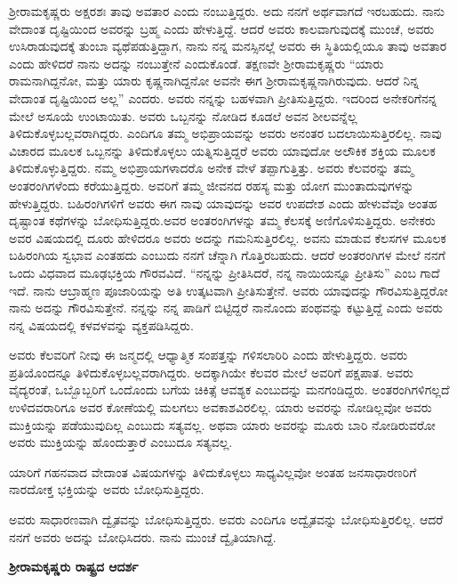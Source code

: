 ಶ‍್ರೀರಾಮಕೃಷ್ಣರು ಅಕ್ಷರಶಃ ತಾವು ಅವತಾರ ಎಂದು ನಂಬುತ್ತಿದ್ದರು. ಅದು ನನಗೆ ಅರ್ಥವಾಗದೆ ಇರಬಹುದು. ನಾನು ವೇದಾಂತ ದೃಷ್ಟಿಯಿಂದ ಅವರನ್ನು ಬ್ರಹ್ಮ ಎಂದು ಹೇಳುತ್ತಿದ್ದೆ. ಆದರೆ ಅವರು ಕಾಲವಾಗುವುದಕ್ಕೆ ಮುಂಚೆ, ಅವರು ಉಸಿರಾಡುವುದಕ್ಕೆ ತುಂಬಾ ವ್ಯಥೆಪಡುತ್ತಿದ್ದಾಗ, ನಾನು ನನ್ನ ಮನಸ್ಸಿನಲ್ಲೆ ಅವರು ಈ ಸ್ಥಿತಿಯಲ್ಲಿಯೂ ತಾವು ಅವತಾರ ಎಂದು ಹೇಳಿದರೆ ನಾನು ಅದನ್ನು ನಂಬುತ್ತೇನೆ ಎಂದುಕೊಂಡೆ. ತಕ್ಷಣವೇ ಶ‍್ರೀರಾಮಕೃಷ್ಣರು “ಯಾರು ರಾಮನಾಗಿದ್ದನೋ, ಮತ್ತು ಯಾರು ಕೃಷ್ಣನಾಗಿದ್ದನೋ ಅವನೇ ಈಗ ಶ‍್ರೀರಾಮಕೃಷ್ಣನಾಗಿರುವುದು. ಆದರೆ ನಿನ್ನ ವೇದಾಂತ ದೃಷ್ಟಿಯಿಂದ ಅಲ್ಲ” ಎಂದರು. ಅವರು ನನ್ನನ್ನು ಬಹಳವಾಗಿ ಪ್ರೀತಿಸುತ್ತಿದ್ದರು. ಇದರಿಂದ ಅನೇಕರಿಗೆ\break ನನ್ನ ಮೇಲೆ ಅಸೂಯೆ ಉಂಟಾಯಿತು. ಅವರು ಒಬ್ಬನನ್ನು ನೋಡಿದ ಕೂಡಲೆ ಅವನ ಶೀಲವನ್ನೆಲ್ಲ ತಿಳಿದುಕೊಳ್ಳಬಲ್ಲವರಾಗಿದ್ದರು. ಎಂದಿಗೂ ತಮ್ಮ ಅಭಿಪ್ರಾಯವನ್ನು ಅವರು ಅನಂತರ ಬದಲಾಯಿಸುತ್ತಿರಲಿಲ್ಲ. ನಾವು ವಿಚಾರದ ಮೂಲಕ ಒಬ್ಬನನ್ನು ತಿಳಿದುಕೊಳ್ಳಲು ಯತ್ನಿಸುತ್ತಿದ್ದರೆ ಅವರು ಯಾವುದೋ ಅಲೌಕಿಕ ಶಕ್ತಿಯ ಮೂಲಕ ತಿಳಿದುಕೊಳ್ಳುತ್ತಿದ್ದರು. ನಮ್ಮ ಅಭಿಪ್ರಾಯಗಳಾದರೊ ಅನೇಕ ವೇಳೆ ತಪ್ಪಾಗುತ್ತಿತ್ತು. ಅವರು ಕೆಲವರನ್ನು ತಮ್ಮ ಅಂತರಂಗಿಗಳೆಂದು ಕರೆಯುತ್ತಿದ್ದರು. ಅವರಿಗೆ ತಮ್ಮ ಜೀವನದ ರಹಸ್ಯ ಮತ್ತು ಯೋಗ ಮುಂತಾದುವುಗಳನ್ನು ಹೇಳುತ್ತಿದ್ದರು. ಬಹಿರಂಗಿಗಳಿಗೆ ಅವರು ಈಗ ನಾವು ಯಾವುದನ್ನು ಅವರ ಉಪದೇಶ ಎಂದು ಹೇಳುವೆವೊ ಅಂತಹ ದೃಷ್ಟಾಂತ ಕಥೆಗಳನ್ನು ಬೋಧಿಸುತ್ತಿದ್ದರು.\break ಅವರ ಅಂತರಂಗಿಗಳನ್ನು ತಮ್ಮ ಕೆಲಸಕ್ಕೆ ಅಣಿಗೊಳಿಸುತ್ತಿದ್ದರು. ಅನೇಕರು ಅವರ ವಿಷಯದಲ್ಲಿ ದೂರು ಹೇಳಿದರೂ ಅವರು ಅದನ್ನು ಗಮನಿಸುತ್ತಿರಲಿಲ್ಲ. ಅವನು ಮಾಡುವ ಕೆಲಸಗಳ ಮೂಲಕ ಬಹಿರಂಗಿಯ ಸ್ವಭಾವ ಎಂತಹದು ಎಂಬುದು ನನಗೆ ಚೆನ್ನಾಗಿ ಗೊತ್ತಿರಬಹುದು. ಆದರೆ ಅಂತರಂಗಿಗಳ ಮೇಲೆ ನನಗೆ ಒಂದು ವಿಧವಾದ ಮೂಢಭಕ್ತಿಯ ಗೌರವವಿದೆ. “ನನ್ನನ್ನು ಪ್ರೀತಿಸಿದರೆ, ನನ್ನ ನಾಯಿಯನ್ನೂ ಪ್ರೀತಿಸು” ಎಂಬ ಗಾದೆ ಇದೆ. ನಾನು ಆ\break ಬ್ರಾಹ್ಮಣ ಪೂಜಾರಿಯನ್ನು ಅತಿ ಉತ್ಕಟವಾಗಿ ಪ್ರೀತಿಸುತ್ತೇನೆ. ಅವರು ಯಾವುದನ್ನು ಗೌರವಿಸುತ್ತಿದ್ದರೋ ನಾನು ಅದನ್ನು ಗೌರವಿಸುತ್ತೇನೆ. ನನ್ನನ್ನು ನನ್ನ ಪಾಡಿಗೆ ಬಿಟ್ಟಿದ್ದರೆ ನಾನೊಂದು ಪಂಥವನ್ನು ಕಟ್ಟುತ್ತಿದ್ದೆ ಎಂದು ಅವರು ನನ್ನ ವಿಷಯದಲ್ಲಿ ಕಳವಳವನ್ನು ವ್ಯಕ್ತಪಡಿಸಿದ್ದರು.

ಅವರು ಕೆಲವರಿಗೆ ನೀವು ಈ ಜನ್ಮದಲ್ಲಿ ಆಧ್ಯಾತ್ಮಿಕ ಸಂಪತ್ತನ್ನು ಗಳಿಸಲಾರಿರಿ ಎಂದು ಹೇಳುತ್ತಿದ್ದರು. ಅವರು ಪ್ರತಿಯೊಂದನ್ನೂ ತಿಳಿದುಕೊಳ್ಳಬಲ್ಲವರಾಗಿದ್ದರು. ಅದಕ್ಕಾಗಿಯೇ ಕೆಲವರ ಮೇಲೆ ಅವರಿಗೆ ಪಕ್ಷಪಾತ. ಅವರು ವೈದ್ಯರಂತೆ, ಒಬ್ಬೊಬ್ಬರಿಗೆ ಒಂದೊಂದು ಬಗೆಯ ಚಿಕಿತ್ಸೆ ಆವಶ್ಯಕ ಎಂಬುದನ್ನು ಮನಗಂಡಿದ್ದರು. ಅಂತರಂಗಿಗಳಿಗಲ್ಲದೆ ಉಳಿದವರಾರಿಗೂ ಅವರ ಕೋಣೆಯಲ್ಲಿ ಮಲಗಲು ಅವಕಾಶವಿರಲಿಲ್ಲ. ಯಾರು ಅವರನ್ನು ನೋಡಿಲ್ಲವೋ ಅವರು ಮುಕ್ತಿಯನ್ನು ಪಡೆಯುವುದಿಲ್ಲ ಎಂಬುದು ಸತ್ಯವಲ್ಲ. ಅಥವಾ ಯಾರು ಅವರನ್ನು ಮೂರು ಬಾರಿ ನೋಡಿರುವರೋ ಅವರು ಮುಕ್ತಿಯನ್ನು ಹೊಂದುತ್ತಾರೆ ಎಂಬುದೂ ಸತ್ಯವಲ್ಲ.

ಯಾರಿಗೆ ಗಹನವಾದ ವೇದಾಂತ ವಿಷಯಗಳನ್ನು ತಿಳಿದುಕೊಳ್ಳಲು ಸಾಧ್ಯವಿಲ್ಲವೋ ಅಂತಹ ಜನಸಾಧಾರಣರಿಗೆ ನಾರದೋಕ್ತ ಭಕ್ತಿಯನ್ನು ಅವರು ಬೋಧಿಸುತ್ತಿದ್ದರು.

ಅವರು ಸಾಧಾರಣವಾಗಿ ದ್ವೈತವನ್ನು ಬೋಧಿಸುತ್ತಿದ್ದರು. ಅವರು ಎಂದಿಗೂ ಅದ್ವೈತವನ್ನು ಬೋಧಿಸುತ್ತಿರಲಿಲ್ಲ. ಆದರೆ ನನಗೆ ಅವರು ಅದನ್ನು ಬೋಧಿಸಿದರು. ನಾನು ಮುಂಚೆ ದ್ವೈತಿಯಾಗಿದ್ದೆ.

\centerline{\textbf{ಶ‍್ರೀರಾಮಕೃಷ್ಣರು ರಾಷ್ಟ್ರದ ಆದರ್ಶ}}

